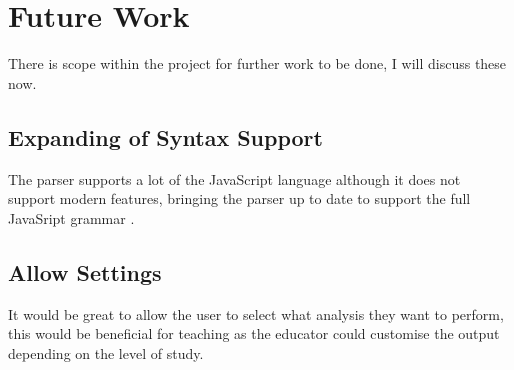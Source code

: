 \section{Future Work}
There is scope within the project for further work to be done, I will discuss these now.
\subsection{Expanding of Syntax Support}
The parser supports a lot of the JavaScript language although it does not support modern features, bringing the parser 
up to date to support the full JavaSript grammar \cite{ecmascript2017}.

\subsection{Allow Settings}
It would be great to allow the user to select what analysis they want to perform, this would be beneficial for teaching as 
the educator could customise the output depending on the level of study.


